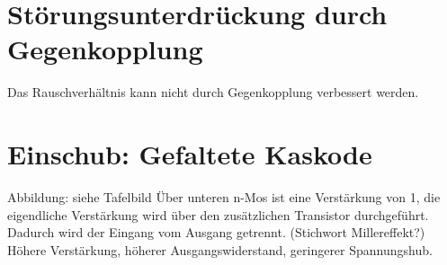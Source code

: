 \documentclass[a4paper]{article}
\begin{document}
\section*{Störungsunterdrückung durch Gegenkopplung}
Das Rauschverhältnis kann nicht durch Gegenkopplung verbessert werden.

\section*{Einschub: Gefaltete Kaskode}
Abbildung: siehe Tafelbild
Über unteren n-Mos ist eine Verstärkung von 1, die eigendliche Verstärkung wird
über den zusätzlichen Transistor durchgeführt. Dadurch wird der Eingang vom Ausgang getrennt. (Stichwort Millereffekt?)
Höhere Verstärkung, höherer Ausgangswiderstand, geringerer Spannungshub.
\end{document}
